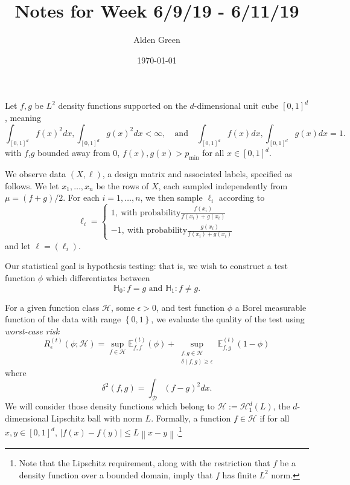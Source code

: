 \documentclass{article}
\newcommand{\norm}[1]{\left\lVert#1\right\rVert}
\newcommand{\abs}[1]{\left \lvert #1 \right \rvert}
\newcommand{\set}[1]{\left\{#1\right\}}
\newcommand{\1}{\mathbb{I}}
\newcommand{\D}{\mathcal{D}}
\newcommand{\Hclass}{\mathcal{H}}
\newcommand{\Ebb}{\mathbb{E}}
\theoremstyle{alden}
\theoremstyle{aldenthm}
\theoremstyle{definition}
\theoremstyle{remark}
\begin{document}
\title{Notes for Week 6/9/19 - 6/11/19}
\author{Alden Green}
\date{\today}
\maketitle

Let $f,g$ be $L^2$ density functions supported on the $d$-dimensional unit cube $[0,1]^d$, meaning
\begin{equation*}
\int_{[0,1]^d} f(x)^2 dx, \int_{[0,1]^d} g(x)^2 dx < \infty, \quad \text{and} \quad \int_{[0,1]^d} f(x) dx, \int_{[0,1]^d} g(x) dx = 1.
\end{equation*}
with $f$,$g$ bounded away from $0$, $f(x), g(x) > p_{\min}$ for all $x \in [0,1]^d$.

We observe data $(X,\ell)$, a design matrix and associated labels, specified as follows. We let $x_1, \ldots, x_n$ be the rows of $X$, each sampled independently from $\mu = (f + g)/2$. For each $i = 1,\ldots,n$, we then sample $\ell_i$ according to
\begin{equation*}
\ell_i =
\begin{cases}
1,~ \textrm{with probability} \frac{f(x_i)}{f(x_i) + g(x_i)} \\
-1,~ \textrm{with probability} \frac{g(x_i)}{f(x_i) + g(x_i)}
\end{cases}
\end{equation*}
and let $\ell = (\ell_i)$. 

Our statistical goal is hypothesis testing: that is, we wish to construct a test function $\phi$ which differentiates between
\begin{equation*}
\mathbb{H}_0: f = g \text{ and } \mathbb{H}_1: f \neq g.
\end{equation*}

For a given function class $\Hclass$, some $\epsilon > 0$, and test function $\phi$ a Borel measurable function of the data with range $\set{0,1}$, we evaluate the quality of the test using \emph{worst-case risk}
\begin{equation*}
R_{\epsilon}^{(t)}(\phi; \Hclass) = \sup_{f \in \Hclass} \Ebb_{f,f}^{(t)}(\phi) + \sup_{ \substack{f,g \in \Hclass \\ \delta(f,g) \geq \epsilon } } \Ebb_{f,g}^{(t)}(1 - \phi)
\end{equation*} 
where 
\begin{equation*}
\delta^2(f,g) = \int_{\D} (f - g)^2 dx.
\end{equation*}
We will consider those density functions which belong to $\mathcal{H} := \mathcal{H}_{1}^d(L)$, the $d$-dimensional Lipschitz ball with norm $L$. Formally, a function $f \in \mathcal{H}$ if for all $x,y \in [0,1]^d$, $\abs{f(x) - f(y)} \leq L \norm{x - y}$.\footnote{Note that the Lipschitz requirement, along with the restriction that $f$ be a density function over a bounded domain, imply that $f$ has finite $L^2$ norm.}
\end{document}
